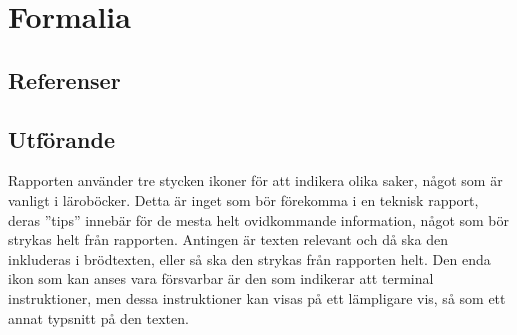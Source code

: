 \section{Formalia} %
\label{sec:formalia}
    \subsection{Referenser} %
    \label{sub:references}
       

    \subsection{Utförande} %
    \label{sub:utforande}
        Rapporten använder tre stycken ikoner för att indikera olika saker, något som är vanligt i läroböcker. Detta är inget som bör förekomma i en teknisk rapport, deras ''tips'' innebär för de mesta helt ovidkommande information, något som bör strykas helt från rapporten. Antingen är texten relevant och då ska den inkluderas i brödtexten, eller så ska den strykas från rapporten helt. Den enda ikon som kan anses vara försvarbar är den som indikerar att terminal instruktioner, men dessa instruktioner kan visas på ett lämpligare vis, så som ett annat typsnitt på den texten.
